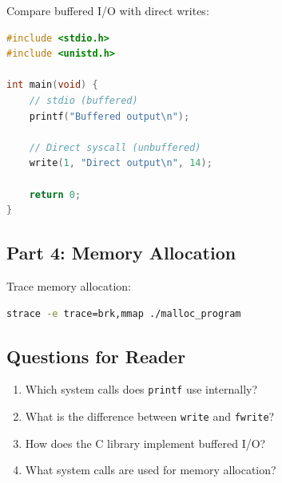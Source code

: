 Compare buffered I/O with direct writes:

\begin{lstlisting}[language=C]
#include <stdio.h>
#include <unistd.h>

int main(void) {
    // stdio (buffered)
    printf("Buffered output\n");
    
    // Direct syscall (unbuffered)
    write(1, "Direct output\n", 14);
    
    return 0;
}
\end{lstlisting}

\subsection{Part 4: Memory Allocation}

Trace memory allocation:

\begin{lstlisting}[language=bash]
strace -e trace=brk,mmap ./malloc_program
\end{lstlisting}

\subsection{Questions for Reader}

\begin{enumerate}
\item Which system calls does \texttt{printf} use internally?
\item What is the difference between \texttt{write} and \texttt{fwrite}?
\item How does the C library implement buffered I/O?
\item What system calls are used for memory allocation?
\end{enumerate}

